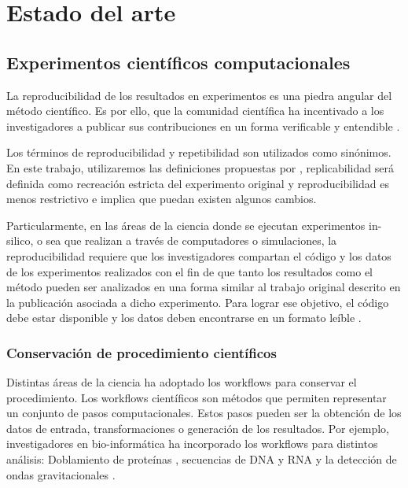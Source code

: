 
\chapter{Estado del arte} %

\label{Chapter2} %


\section{Experimentos científicos computacionales} 

La reproducibilidad de los resultados en experimentos es una piedra angular del método científico. Es por ello, que la comunidad científica ha incentivado a los investigadores a publicar sus contribuciones en un forma verificable y entendible \cite{james2014standing,stodden2010reproducible}.

Los términos de reproducibilidad y repetibilidad son utilizados como sinónimos. En este trabajo, utilizaremos las definiciones propuestas por \cite{santana2017reproducibility}, replicabilidad será definida como recreación estricta del experimento original y reproducibilidad es menos restrictivo e implica que puedan existen algunos cambios.

Particularmente, en las áreas de la ciencia donde se ejecutan experimentos in-silico, o sea que realizan a través de computadores o simulaciones, la reproducibilidad requiere que los investigadores compartan el código y los datos de los experimentos realizados con el fin de que tanto los resultados como el método pueden ser analizados en una forma similar al trabajo original descrito en la publicación asociada a dicho experimento. Para lograr ese objetivo, el código debe estar disponible y los datos deben encontrarse en un formato leíble \cite{stodden2014implementing}.


\subsection{Conservación de procedimiento científicos}

Distintas áreas de la ciencia ha adoptado los workflows para conservar el procedimiento. Los workflows científicos son métodos que permiten representar un conjunto de pasos computacionales. Estos pasos pueden ser la obtención de los datos de entrada, transformaciones o generación de los resultados.
Por ejemplo, investigadores en bio-informática ha incorporado los workflows para distintos análisis: 
Doblamiento de proteínas \cite{craddock2006science}, secuencias de DNA y RNA \cite{blankenberg2010galaxy,giardine2005galaxy} y la detección de ondas gravitacionales \cite{deelman2004pegasus}.


